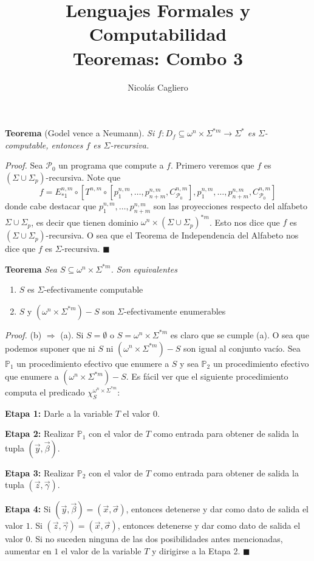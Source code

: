 \documentclass{article}
\title{Lenguajes Formales y Computabilidad \\
        \large Teoremas: Combo 3 }
\author{Nicolás Cagliero}
\begin{document}
\maketitle

\textbf{Teorema} (Godel vence a Neumann). \textit{Si $f : D_f \subseteq \omega^n \times \Sigma^{*m} \to \Sigma^{*}$ es $\Sigma$-computable, entonces $f$ es $\Sigma$-recursiva.}

\textit{Proof.} Sea $\mathcal{P}_0$ un programa que compute a $f$. Primero veremos que $f$ es $(\Sigma \cup \Sigma_p)$-recursiva. Note que
\[
f = E^{n,m}_{*1} \circ [T^{n,m} \circ [p^{n,m}_{1}, \ldots, p^{n,m}_{n+m}, C^{n,m}_{\mathcal{P}_0}], p^{n,m}_{1}, \ldots, p^{n,m}_{n+m}, C^{n,m}_{\mathcal{P}_0}]
\]
donde cabe destacar que $p^{n,m}_{1}, \ldots, p^{n,m}_{n+m}$ son las proyecciones respecto del alfabeto $\Sigma \cup \Sigma_p$, es decir que tienen dominio $\omega^n \times (\Sigma \cup \Sigma_p)^{*m}$. Esto nos dice que $f$ es $(\Sigma \cup \Sigma_p)$-recursiva. O sea que el Teorema de Independencia del Alfabeto nos dice que $f$ es $\Sigma$-recursiva.
\hfill $\blacksquare$

\vspace{1em}

\textbf{Teorema} \textit{Sea $S \subseteq \omega^n \times \Sigma^{*m}$. Son equivalentes}
\begin{enumerate}[label=(\alph*)]
    \item $S$ es $\Sigma$-efectivamente computable
    \item $S$ y $(\omega^n \times \Sigma^{*m}) - S$ son $\Sigma$-efectivamente enumerables
\end{enumerate}

\textit{Proof.} (b) $\Rightarrow$ (a). Si $S = \emptyset$ o $S = \omega^n \times \Sigma^{*m}$ es claro que se cumple (a). O sea que podemos suponer que ni $S$ ni $(\omega^n \times \Sigma^{*m}) - S$ son igual al conjunto vacío. Sea $\mathbb{P}_1$ un procedimiento efectivo que enumere a $S$ y sea $\mathbb{P}_2$ un procedimiento efectivo que enumere a $(\omega^n \times \Sigma^{*m}) - S$. Es fácil ver que el siguiente procedimiento computa el predicado $\chi^{\omega^n \times \Sigma^{*m}}_S$:

\textbf{Etapa 1:} Darle a la variable $T$ el valor $0$.

\textbf{Etapa 2:} Realizar $\mathbb{P}_1$ con el valor de $T$ como entrada para obtener de salida la tupla $(\vec{y}, \vec{\beta})$.

\textbf{Etapa 3:} Realizar $\mathbb{P}_2$ con el valor de $T$ como entrada para obtener de salida la tupla $(\vec{z}, \vec{\gamma})$.

\textbf{Etapa 4:} Si $(\vec{y}, \vec{\beta}) = (\vec{x}, \vec{\sigma})$, entonces detenerse y dar como dato de salida el valor $1$. Si $(\vec{z}, \vec{\gamma}) = (\vec{x}, \vec{\sigma})$, entonces detenerse y dar como dato de salida el valor $0$. Si no suceden ninguna de las dos posibilidades antes mencionadas, aumentar en $1$ el valor de la variable $T$ y dirigirse a la Etapa 2.
\hfill $\blacksquare$
\end{document}
